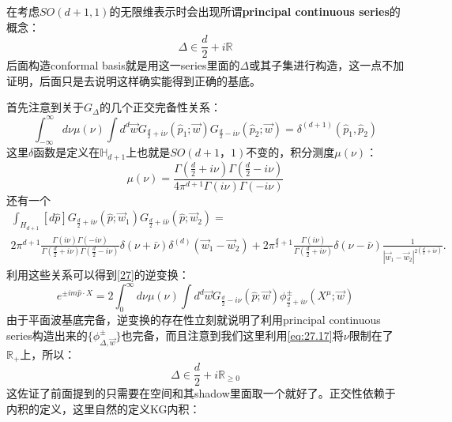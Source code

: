 在考虑$SO(d+1,1)$的无限维表示时会出现所谓\textbf{principal continuous series}的概念：
\begin{equation}
	\boxed{\Delta\in\frac d2+i\mathbb{R}}
\end{equation}
后面构造conformal basis就是用这一series里面的$\Delta$或其子集进行构造，这一点不加证明，后面只是去说明这样确实能得到正确的基底。

首先注意到关于$G_\Delta$的几个正交完备性关系\cite{Costa:2014kfa}：
\begin{equation}
	\int_{-\infty}^{\infty}d\nu\mu(\nu)\int d^{d}\vec{w}G_{\frac{d}{2}+i\nu}(\hat{p}_{1};\vec{w})G_{\frac{d}{2}-i\nu}(\hat{p}_{2};\vec{w})=\delta^{(d+1)}(\hat{p}_{1},\hat{p}_{2})
\end{equation}
这里$\delta$函数是定义在$\mathbb{H}_{d+1}$上也就是$SO(d+1，1)$不变的，积分测度$\mu(\nu)$：
\begin{equation}
	\mu(\nu)=\frac{\Gamma(\frac d2+i\nu)\Gamma(\frac d2-i\nu)}{4\pi^{d+1}\Gamma(i\nu)\Gamma(-i\nu)}
\end{equation}
还有一个
\begin{equation}
	\begin{gathered}
		\int_{H_{d+1}}[d\hat{p}]G_{\frac d2+i\nu}(\hat{p};\vec{w}_{1})G_{\frac d2+i\bar{\nu}}(\hat{p};\vec{w}_{2})= \\
		2\pi^{d+1}\frac{\Gamma(i\nu)\Gamma(-i\nu)}{\Gamma(\frac d2+i\nu)\Gamma(\frac d2-i\nu)}\delta(\nu+\bar{\nu})\delta^{(d)}(\vec{w}_{1}-\vec{w}_{2})+2\pi^{\frac d2+1}\frac{\Gamma(i\nu)}{\Gamma(\frac d2+i\nu)}\delta(\nu-\bar{\nu})\frac{1}{|\vec{w}_{1}-\vec{w}_{2}|^{2(\frac d2+i\nu)}}.
	\end{gathered}
\end{equation}
利用这些关系可以得到\ref{27}的逆变换：
\begin{equation}
	\boxed{e^{\pm im\hat{p}\cdot X}=2\int_0^\infty d\nu\mu(\nu)\int d^d\vec{w}G_{\frac d2-i\nu}(\hat{p};\vec{w})\phi_{\frac d2+i\nu}^\pm(X^\mu;\vec{w})}
\end{equation}
由于平面波基底完备，逆变换的存在性立刻就说明了利用principal continuous series构造出来的$\{\phi^{\pm}_{\Delta,\vec{w}}\}$也完备，而且注意到我们这里利用\ref{eq:27.17}将$\nu$限制在了$\mathbb{R}_+$上，所以：
\begin{equation}\label{eq:27.23}
	\boxed{\Delta\in\frac d2+i\mathbb{R}_{\geq 0}}
\end{equation}
这佐证了前面提到的只需要在空间和其shadow里面取一个就好了。正交性依赖于内积的定义，这里自然的定义KG内积：
